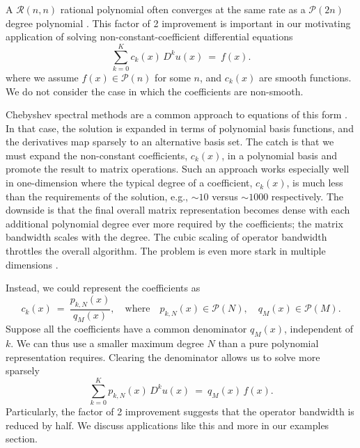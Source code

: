 \documentclass{article}
\begin{document}
{A $\mathcal{R}(n, n)$ rational polynomial often converges at the same rate as a $\mathcal{P}(2n)$ degree polynomial \cite{Trefethen2023}. This factor of 2 improvement is important in our motivating application of solving non-constant-coefficient differential equations}
\begin{equation}
\sum_{k=0}^{K} c_{k}(x) \, D^{k} u(x) \ = \ f(x).
\end{equation}
where we assume $f(x) \in \mathcal{P}(n)$ for some $n$, {and $c_k(x)$ are smooth functions. We do not consider the case in which the coefficients are non-smooth.}

Chebyshev spectral methods are a common approach to equations of this form \cite{chebyshev_spectral_methods, chebop, chebyshev_collocation, chebysev_spectral_radiative_transfer, spectral_methods_matlab}. In that case, the solution is expanded in terms of polynomial basis functions, and the derivatives map sparsely to an alternative basis set.
The catch is that we must expand the non-constant coefficients, $c_{k}(x)$, in a polynomial basis and promote the result to matrix operations. Such an approach works especially well in one-dimension \cite{spectral_methods_sparse, dedalus, vasil_disk, ball1, ball2, papadopoulos2023building} where the typical degree of a coefficient, $c_{k}(x)$, is much less than the requirements of the solution, e.g., $\sim 10$ versus $\sim 1000$ respectively.  {The downside is that the final overall matrix representation becomes dense with each additional polynomial degree ever more required by the coefficients; the matrix bandwidth scales with the degree.} The cubic scaling of operator bandwidth throttles the overall algorithm. The problem is even more stark in multiple dimensions \cite{OTV2019, OTV2020, Ellison_Julien_Vasil_2022, Olver2020Fast, burns2022corner, Townsend2015Automatic}.

{
Instead, we could represent the coefficients as 
\begin{equation}
c_{k}(x) \ = \ \frac{p_{k,N}(x)}{q_{M}(x)}, \quad \text{where} \quad p_{k,N}(x) \in \mathcal{P}(N), \quad q_{M}(x) \in \mathcal{P}(M).
\end{equation}
Suppose all the coefficients have a common denominator $q_{M}(x)$, independent of $k$. 
We can thus use a smaller maximum degree $N$ than a pure polynomial representation requires. Clearing the denominator allows us to solve more sparsely 
\begin{equation}
\sum_{k=0}^{K} p_{k,N}(x) \, D^{k} u(x) \ = \ q_{M}(x) \, f(x).
\end{equation} 
Particularly, the factor of 2 improvement suggests that the operator bandwidth is reduced by half. We discuss applications like this and more in our examples section. }
\end{document}
